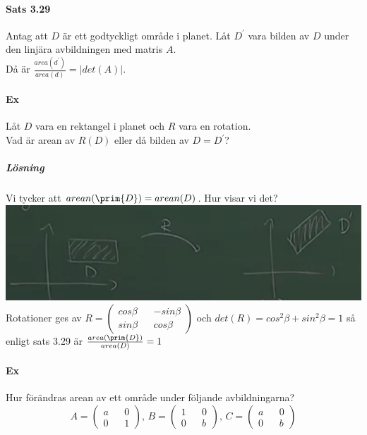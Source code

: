 \paragraph{Sats 3.29} Antag att $D$ är ett godtyckligt område i planet.
Låt $D^{\prime}$ vara bilden av $D$ under den linjära avbildningen med matris $A$.\\
Då är $\frac{area(d^{\prime})}{area(d)}=|det(A)|$.
\\
\paragraph{Ex} Låt $D$ vara en rektangel i planet och $R$ vara en rotation.\\
Vad är arean av $R(D)$ eller då bilden av $D=D^{\prime}$?
\subparagraph{Lösning} Vi tycker att $arean(\prim{D})=arean(D)$.
Hur visar vi det?\\
\includegraphics[scale=0.5]{imgs/img04.png}\\
Rotationer ges av $R=\begin{pmatrix}
    cos\beta&&-sin\beta\\
    sin\beta&&cos\beta
\end{pmatrix}$ och $det(R)=cos^{2}\beta+sin^{2}\beta=1$ så enligt sats 3.29 är $\frac{area(\prim{D})}{area(D)}=1$

\clearpage

\paragraph{Ex} Hur förändras arean av ett område under följande avbildningarna?
\begin{equation*}
    A=\begin{pmatrix}a&&0\\0&&1\end{pmatrix}\text{, }B=\begin{pmatrix}1&&0\\0&&b\end{pmatrix}\text{, }C=\begin{pmatrix}a&&0\\0&&b\end{pmatrix}
\end{equation*}

